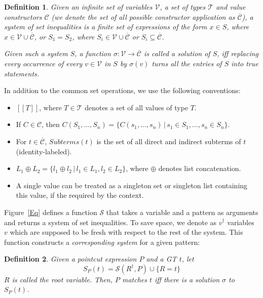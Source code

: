 \documentclass{IOS-Book-Article}     %
\newcommand{\sem}[1]{[\![#1]\!]}
\newcommand{\fresh}[1]{#1^\dagger}
\newcommand{\Eq}{\mathcal{S}}
\newtheorem{Def}{Definition}
\newcommand{\figref}[1]{Figure~\ref{#1}}
\begin{document}
\begin{Def}
Given an infinite set of variables $\mathcal{V}$, a set of types $\mathcal{T}$ and value constructors $\mathcal{C}$ (we denote the set of all possible constructor application as $\overline{\mathcal{C}}$),
a \emph{system of set inequalities} is a finite set of expressions of the form
$x \in S$, where $x \in \mathcal{V} \cup \overline{\mathcal{C}}$, or $S_1 = S_2$, where $S_i \in \mathcal{V} \cup \overline{\mathcal{C}}$ or $S_i \subseteq \overline{\mathcal{C}}$.

Given such a system $S$, a function $\sigma : \mathcal{V}  \rightarrow \overline{\mathcal{C}}$ is called a \emph{solution} of $S$, iff replacing every occurrence of every $v \in \mathcal{V}$ in $S$ by $\sigma(v)$ turns all the entries of $S$ into true statements.
\end{Def}
In addition to the common set operations, we use the following conventions:
\begin{itemize}
	\item $\sem{T}$, where $T \in \mathcal{T}$ denotes a set of all values of type $T$.
	\item If $C \in \mathcal{C}$, then $C(S_1, \ldots, S_n) = \{C(s_1, \ldots, s_n) \,|\, s_1 \in S_1, \ldots, s_n \in S_n\}$.
	\item For $t \in \overline{\mathcal{C}}$, $Subterms(t)$ is the set of all direct and indirect subterms of $t$ (identity-labeled).
	\item $L_1 \oplus L_2 = \{l_1 \oplus l_2 \,|\, l_1 \in L_1, l_2 \in L_2\}$, where $\oplus$ denotes list concatenation.
	\item A single value can be treated as a singleton set or singleton list containing this value, if the required by the context.
\end{itemize}

\figref{Eq} defines a function $\Eq{}$ that takes a variable and a pattern as arguments and returns a system of set inequalities. To save space, we denote as $\fresh{v}$ variables $v$ which are supposed to be fresh with respect to the rest of the system. This function constructs a \emph{corresponding system} for a given pattern:
\begin{Def}\label{SPT}
Given a pointcut expression $P$ and a GT $t$, let 
$$S_P(t) = \Eq{}(\fresh{R}, P) \cup \{R = t\}$$
$R$ is called the \emph{root variable}. Then, $P$ \emph{matches} $t$ iff there is a solution $\sigma$ to $S_P(t)$.
\end{Def}
\end{document}
